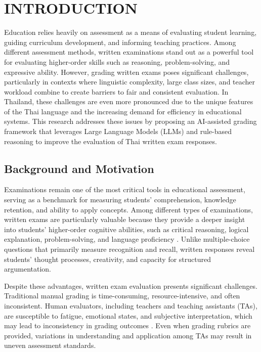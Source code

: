 \chapter{INTRODUCTION}\label{ch:intro}

Education relies heavily on assessment as a means of evaluating student learning, guiding curriculum development, and informing teaching practices. 
Among different assessment methods, written examinations stand out as a powerful tool for evaluating higher-order skills such as reasoning, problem-solving, and expressive ability. 
However, grading written exams poses significant challenges, particularly in contexts where linguistic complexity, large class sizes, and teacher workload combine to create barriers to fair and consistent evaluation. 
In Thailand, these challenges are even more pronounced due to the unique features of the Thai language and the increasing demand for efficiency in educational systems. This research addresses these issues 
by proposing an AI-assisted grading framework that leverages Large Language Models (LLMs) and rule-based reasoning to improve the evaluation of Thai written exam responses.

\section{Background and Motivation}
Examinations remain one of the most critical tools in educational assessment, 
serving as a benchmark for measuring students’ comprehension, knowledge retention, 
and ability to apply concepts. Among different types of examinations, written exams 
are particularly valuable because they provide a deeper insight into students’ higher-order 
cognitive abilities, such as critical reasoning, logical explanation, problem-solving, and 
language proficiency \citep{JungX2024}. Unlike multiple-choice questions that primarily measure recognition and recall, 
written responses reveal students’ thought processes, creativity, and capacity for structured argumentation.

Despite these advantages, written exam evaluation presents significant challenges. 
Traditional manual grading is time-consuming, resource-intensive, and often inconsistent. 
Human evaluators, including teachers and teaching assistants (TAs), are susceptible to fatigue, 
emotional states, and subjective interpretation, which may lead to inconsistency in grading outcomes \citep{Mansson2016}. 
Even when grading rubrics are provided, variations in understanding and application among 
TAs may result in uneven assessment standards.

